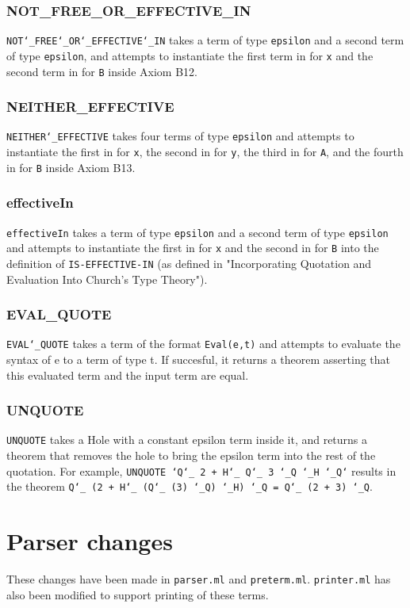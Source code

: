 \documentclass{article}
\def\c#1{\texttt{#1}}
\begin{document}
\subsubsection{NOT\_FREE\_OR\_EFFECTIVE\_IN}
\c{NOT\char`\_FREE\char`\_OR\char`\_EFFECTIVE\char`\_IN} takes a term of type \c{epsilon} and a second term of type \c{epsilon}, and attempts to instantiate the first term in for \c{x} and the second term in for \c{B} inside Axiom B12.

\subsubsection{NEITHER\_EFFECTIVE}
\c{NEITHER\char`\_EFFECTIVE} takes four terms of type \c{epsilon} and attempts to instantiate the first in for \c{x}, the second in for \c{y}, the third in for \c{A}, and the fourth in for \c{B} inside Axiom B13.

\subsubsection{effectiveIn}
\c{effectiveIn} takes a term of type \c{epsilon} and a second term of type \c{epsilon} and attempts to instantiate the first in for \c{x} and the second in for \c{B} into the definition of \c{IS-EFFECTIVE-IN} (as defined in "Incorporating Quotation and Evaluation Into Church’s Type Theory").

\subsubsection{EVAL\_QUOTE}
\c{EVAL\char`\_QUOTE} takes a term of the format \c{Eval(e,t)} and attempts to evaluate the syntax of e to a term of type t. If succesful, it returns a theorem asserting that this evaluated term and the input term are equal.

\subsubsection{UNQUOTE}
\c{UNQUOTE} takes a Hole with a constant epsilon term inside it, and returns a theorem that removes the hole to bring the epsilon term into the rest of the quotation. For example, \c{UNQUOTE `Q\char`\_ 2 + H\char`\_ Q\char`\_ 3 \char`\_Q \char`\_H \char`\_Q`} results in the theorem \c{Q\char`\_ (2 + H\char`\_ (Q\char`\_ (3) \char`\_Q) \char`\_H) \char`\_Q = Q\char`\_ (2 + 3) \char`\_Q}. 

\section{Parser changes}
These changes have been made in \c{parser.ml} and \c{preterm.ml}. \c{printer.ml} has also been modified to support printing of these terms.
\end{document}
